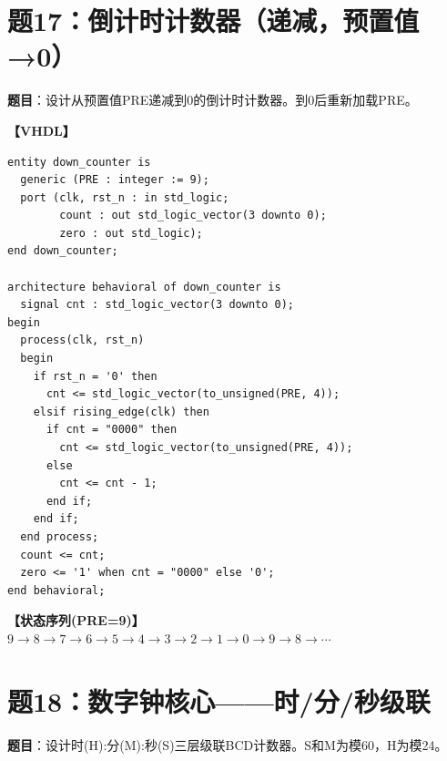 \section{题17：倒计时计数器（递减，预置值→0）}

\textbf{题目}：设计从预置值PRE递减到0的倒计时计数器。到0后重新加载PRE。

\begin{solution}[完整解答]

\textbf{【VHDL】}
\begin{lstlisting}
entity down_counter is
  generic (PRE : integer := 9);
  port (clk, rst_n : in std_logic;
        count : out std_logic_vector(3 downto 0);
        zero : out std_logic);
end down_counter;

architecture behavioral of down_counter is
  signal cnt : std_logic_vector(3 downto 0);
begin
  process(clk, rst_n)
  begin
    if rst_n = '0' then
      cnt <= std_logic_vector(to_unsigned(PRE, 4));
    elsif rising_edge(clk) then
      if cnt = "0000" then
        cnt <= std_logic_vector(to_unsigned(PRE, 4));
      else
        cnt <= cnt - 1;
      end if;
    end if;
  end process;
  count <= cnt;
  zero <= '1' when cnt = "0000" else '0';
end behavioral;
\end{lstlisting}

\textbf{【状态序列(PRE=9)】}$9\to8\to7\to6\to5\to4\to3\to2\to1\to0\to9\to8\to\cdots$

\end{solution}


\section{题18：数字钟核心——时/分/秒级联}

\textbf{题目}：设计时(H):分(M):秒(S)三层级联BCD计数器。S和M为模60，H为模24。

